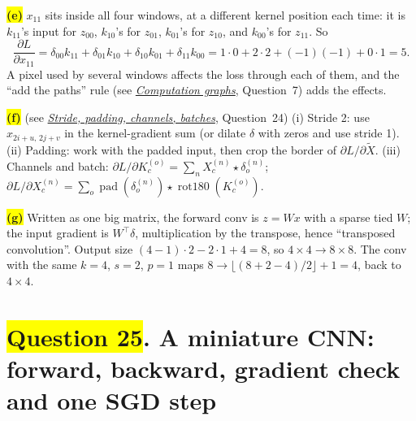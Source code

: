 \documentclass[12pt,a4paper]{article}
\newcommand{\seeconcept}[3]{(see \hyperref[#1]{\textit{#2}}, Question~#3)}
\newcommand{\rot}{\operatorname{rot180}}
\newcommand{\hlq}[1]{{\setlength{\fboxsep}{1.5pt}\colorbox{yellow}{#1}}}
\begin{document}
\hlq{\textbf{(e)}} $x_{11}$ sits inside all four windows, at a different kernel position each time: it is $k_{11}$'s input for $z_{00}$, $k_{10}$'s for $z_{01}$, $k_{01}$'s for $z_{10}$, and $k_{00}$'s for $z_{11}$. So
\[
\frac{\partial L}{\partial x_{11}}=\delta_{00}k_{11}+\delta_{01}k_{10}+\delta_{10}k_{01}+\delta_{11}k_{00}=1\cdot0+2\cdot2+(-1)(-1)+0\cdot1=5 .
\]
A pixel used by several windows affects the loss through each of them, and the ``add the paths'' rule \seeconcept{c:graph}{Computation graphs}{7} adds the effects.

\hlq{\textbf{(f)}} \seeconcept{c:convgradmore}{Stride, padding, channels, batches}{24}
(i) Stride 2: use $x_{2i+u,\,2j+v}$ in the kernel-gradient sum (or dilate $\delta$ with zeros and use stride 1). (ii) Padding: work with the padded input, then crop the border of $\partial L/\partial\tilde X$. (iii) Channels and batch: $\partial L/\partial K^{(o)}_c=\sum_n X^{(n)}_c\star\delta^{(n)}_o$; $\partial L/\partial X^{(n)}_c=\sum_o\operatorname{pad}(\delta^{(n)}_o)\star\rot(K^{(o)}_c)$.

\hlq{\textbf{(g)}} Written as one big matrix, the forward conv is $z=Wx$ with a sparse tied $W$; the input gradient is $W^\top\delta$, multiplication by the transpose, hence ``transposed convolution''. Output size $(4-1)\cdot2-2\cdot1+4=8$, so $4\times4\to8\times8$. The conv with the same $k=4$, $s=2$, $p=1$ maps $8\to\lfloor(8+2-4)/2\rfloor+1=4$, back to $4\times4$.

\section[Question 25. A miniature CNN: forward, backward, gradient check and one SGD step]{\hlq{Question 25}. A miniature CNN: forward, backward, gradient check and one SGD step}
\end{document}
